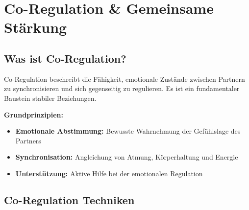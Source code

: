 
\section{Co-Regulation \& Gemeinsame Stärkung}
\label{sec:co-regulation}

\begin{ctmmBlueBox}[title=Tool 26: Co-Regulation System]

\subsection{Was ist Co-Regulation?}

Co-Regulation beschreibt die Fähigkeit, emotionale Zustände zwischen Partnern zu synchronisieren und sich gegenseitig zu regulieren. Es ist ein fundamentaler Baustein stabiler Beziehungen.

\vspace{0.5em}

\textbf{Grundprinzipien:}
\begin{itemize}
  \item \textcolor{ctmmBlue}{\textbf{Emotionale Abstimmung:}} Bewusste Wahrnehmung der Gefühlslage des Partners
  \item \textcolor{ctmmGreen}{\textbf{Synchronisation:}} Angleichung von Atmung, Körperhaltung und Energie
  \item \textcolor{ctmmOrange}{\textbf{Unterstützung:}} Aktive Hilfe bei der emotionalen Regulation
\end{itemize}

\end{ctmmBlueBox}

\subsection{Co-Regulation Techniken}

